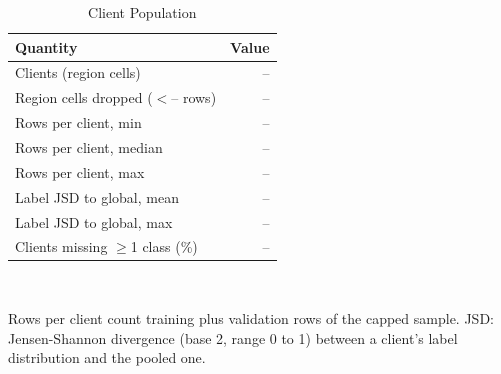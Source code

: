 \begin{table}[t]
\centering
\footnotesize
\caption{Client Population}
\label{tab:clients}
\setlength{\tabcolsep}{4pt}
\begin{tabular}{lr}
\toprule
Quantity & Value \\
\midrule
Clients (region cells) & -- \\
Region cells dropped ($<$-- rows) & -- \\
Rows per client, min & -- \\
Rows per client, median & -- \\
Rows per client, max & -- \\
Label JSD to global, mean & -- \\
Label JSD to global, max & -- \\
Clients missing $\geq$1 class (\%) & -- \\
\bottomrule
\end{tabular}
\\[2pt]
\parbox{\linewidth}{\scriptsize Rows per client count training plus validation rows of the capped sample. JSD: Jensen-Shannon divergence (base 2, range 0 to 1) between a client's label distribution and the pooled one.}
\end{table}
